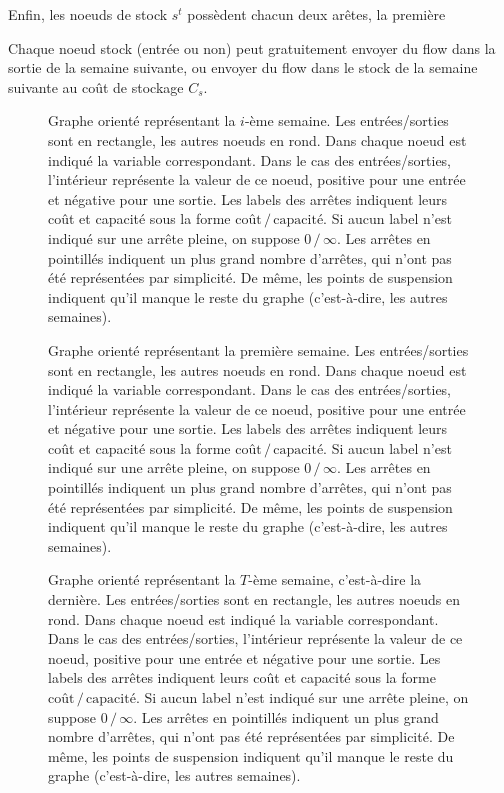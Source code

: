 Enfin, les noeuds de stock $s^t$ possèdent chacun deux arêtes, la première 

Chaque noeud \og{}stock\fg{} (entrée ou non) peut gratuitement envoyer du flow dans la sortie de la semaine suivante, ou envoyer du flow dans le stock de la semaine suivante au coût de stockage $C_{s}$.

\begin{figure}[htb] \label{flow_i}
    \centering
    \caption{Graphe orienté représentant la $i$-ème semaine. Les entrées/sorties sont en rectangle, les autres noeuds en rond. Dans chaque noeud est indiqué la variable correspondant. Dans le cas des entrées/sorties, l'intérieur représente la valeur de ce noeud, positive pour une entrée et négative pour une sortie. Les labels des arrêtes indiquent leurs coût et capacité sous la forme \og{}$\text{coût}\,/\,\text{capacité}$\fg{}. Si aucun label n'est indiqué sur une arrête pleine, on suppose $0\,/\,\infty$. Les arrêtes en pointillés indiquent un plus grand nombre d'arrêtes, qui n'ont pas été représentées par simplicité. De même, les points de suspension indiquent qu'il manque le reste du graphe (c'est-à-dire, les autres semaines).}
\end{figure}

\begin{figure}[htb] \label{flow_first}
    \centering
    \caption{Graphe orienté représentant la première semaine. Les entrées/sorties sont en rectangle, les autres noeuds en rond. Dans chaque noeud est indiqué la variable correspondant. Dans le cas des entrées/sorties, l'intérieur représente la valeur de ce noeud, positive pour une entrée et négative pour une sortie. Les labels des arrêtes indiquent leurs coût et capacité sous la forme \og{}$\text{coût}\,/\,\text{capacité}$\fg{}. Si aucun label n'est indiqué sur une arrête pleine, on suppose $0\,/\,\infty$. Les arrêtes en pointillés indiquent un plus grand nombre d'arrêtes, qui n'ont pas été représentées par simplicité. De même, les points de suspension indiquent qu'il manque le reste du graphe (c'est-à-dire, les autres semaines).}
\end{figure}

\begin{figure}[htb] \label{flow_last}
    \centering
    \caption{Graphe orienté représentant la $T$-ème semaine, c'est-à-dire la dernière. Les entrées/sorties sont en rectangle, les autres noeuds en rond. Dans chaque noeud est indiqué la variable correspondant. Dans le cas des entrées/sorties, l'intérieur représente la valeur de ce noeud, positive pour une entrée et négative pour une sortie. Les labels des arrêtes indiquent leurs coût et capacité sous la forme \og{}$\text{coût}\,/\,\text{capacité}$\fg{}. Si aucun label n'est indiqué sur une arrête pleine, on suppose $0\,/\,\infty$. Les arrêtes en pointillés indiquent un plus grand nombre d'arrêtes, qui n'ont pas été représentées par simplicité. De même, les points de suspension indiquent qu'il manque le reste du graphe (c'est-à-dire, les autres semaines).}
\end{figure}



